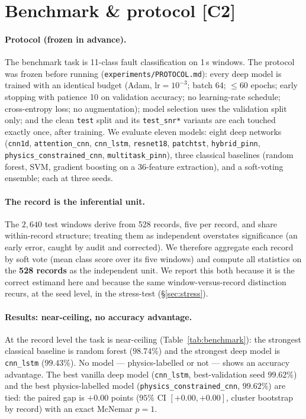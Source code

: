 \documentclass{article}
\begin{document}


\section{Benchmark \& protocol [C2]}
\label{sec:benchmark}

\paragraph{Protocol (frozen in advance).}
The benchmark task is 11-class fault classification on 1\,s windows. The
protocol was frozen before running (\texttt{experiments/PROTOCOL.md}): every deep
model is trained with an identical budget (Adam, $\mathrm{lr}=10^{-3}$; batch
64; $\le$60 epochs; early stopping with patience 10 on validation accuracy; no
learning-rate schedule; cross-entropy loss; no augmentation); model selection
uses the validation split only; and the clean \texttt{test} split and its
\texttt{test\_snr*} variants are each touched exactly once, after training. We
evaluate eleven models: eight deep networks (\texttt{cnn1d},
\texttt{attention\_cnn}, \texttt{cnn\_lstm}, \texttt{resnet18},
\texttt{patchtst}, \texttt{hybrid\_pinn}, \texttt{physics\_constrained\_cnn},
\texttt{multitask\_pinn}), three classical baselines (random forest, SVM,
gradient boosting on a 36-feature extraction), and a soft-voting ensemble; each
at three seeds.

\paragraph{The record is the inferential unit.}
The $2{,}640$ test windows derive from 528 records, five per record, and share
within-record structure; treating them as independent overstates significance
(an early error, caught by audit and corrected). We therefore aggregate each
record by soft vote (mean class score over its five windows) and compute all
statistics on the \textbf{528 records} as the independent unit. We report this
both because it is the correct estimand here and because the same
window-versus-record distinction recurs, at the seed level, in the stress-test
(\S\ref{sec:stress}).

\paragraph{Results: near-ceiling, no accuracy advantage.}
At the record level the task is near-ceiling (Table~\ref{tab:benchmark}): the
strongest classical baseline is random forest ($98.74\%$) and the strongest deep
model is \texttt{cnn\_lstm} ($99.43\%$). No model --- physics-labelled or not ---
shows an accuracy advantage. The best vanilla deep model (\texttt{cnn\_lstm},
best-validation seed $99.62\%$) and the best physics-labelled model
(\texttt{physics\_constrained\_cnn}, $99.62\%$) are tied: the paired gap is
$+0.00$ points ($95\%$ CI $[+0.00,+0.00]$, cluster bootstrap by record) with an
exact McNemar $p=1$.
\end{document}
